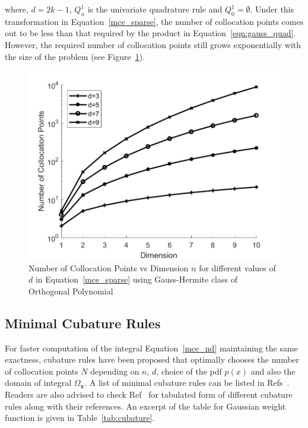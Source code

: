 \noindent where, $d=2k-1$, $Q_n^1$ is the univariate quadrature rule and $Q_0^1 = \emptyset$. Under this transformation in Equation~\ref{mce_sparse}, the number of collocation points comes out to be less than that required by the product in Equation~\ref{eqn:gauss_quad}. However, the required number of collocation points still grows exponentially with the size of the problem (see Figure~\ref{fig:gauss_quad_sparse}). 

\begin{figure}[H]
\centering
\includegraphics[width=\textwidth]{intr_figs/gauss_hermite_sparse}
\caption{Number of Collocation Points vs Dimension $n$ for different values of $d$ in Equation~\ref{mce_sparse} using Gauss-Hermite class of Orthogonal Polynomial}
\label{fig:gauss_quad_sparse}
\end{figure}

\subsection{Minimal Cubature Rules}

For faster computation of the integral Equation~\ref{mce_nd} maintaining the same exactness, cubature rules have been proposed that optimally chooses the number of collocation points $N$ depending on $n$, $d$, choice of the pdf $p(x)$ and also the domain of integral $\Omega_{\textbf{x}}$. A list of minimal cubature rules can be listed in Refs~\cite{stroud1971approximate,cools2003encyclopaedia,Cools1}. Readers are also advised to check Ref~\cite{cubatureurl} for tabulated form of different cubature rules along with their references. An excerpt of the table for Gaussian weight function is given in Table~\ref{tab:cubature}.


